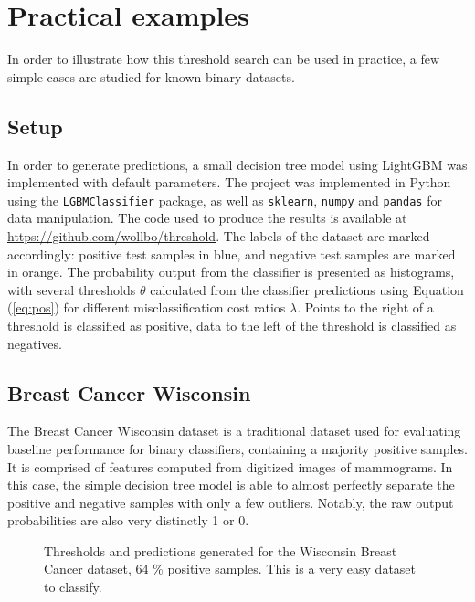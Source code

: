 \documentclass{article}
\begin{document}

\section{Practical examples}
In order to illustrate how this threshold search can be used in practice, a few simple cases are studied for known binary datasets.
\subsection{Setup}
In order to generate predictions, a small decision tree model using LightGBM was implemented with default parameters. The project was implemented in Python using the \texttt{LGBMClassifier} package, as well as \texttt{sklearn}, \texttt{numpy} and \texttt{pandas} for data manipulation. The code used to produce the results is available at \url{https://github.com/wollbo/threshold}. The labels of the dataset are marked accordingly: positive test samples in blue, and negative test samples are marked in orange. The probability output from the classifier is presented as histograms, with several thresholds $\theta$ calculated from the classifier predictions using Equation (\ref{eq:pos}) for different misclassification cost ratios $\lambda$. Points to the right of a threshold is classified as positive, data to the left of the threshold is classified as negatives.
\subsection{Breast Cancer Wisconsin}
The Breast Cancer Wisconsin dataset is a traditional dataset used for evaluating baseline performance for binary classifiers, containing a majority positive samples. It is comprised of features computed from digitized images of mammograms. In this case, the simple decision tree model is able to almost perfectly separate the positive and negative samples with only a few outliers. Notably, the raw output probabilities are also very distinctly 1 or 0.
\begin{figure}[H]
    \centering
    \scalebox{.8}{}
    \caption{Thresholds and predictions generated for the Wisconsin Breast Cancer dataset, 64 \% positive samples. This is a very easy dataset to classify.}
\end{figure}
\end{document}
